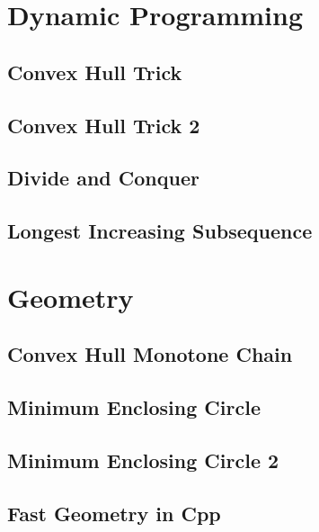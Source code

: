 \section{Dynamic Programming}
\subsection{Convex Hull Trick}
\raggedbottom
\hrulefill
\subsection{Convex Hull Trick 2}
\raggedbottom
\hrulefill
\subsection{Divide and Conquer}
\raggedbottom
\hrulefill
\subsection{Longest Increasing Subsequence}
\raggedbottom
\hrulefill

\section{Geometry}
\subsection{Convex Hull Monotone Chain}
\raggedbottom
\hrulefill
\subsection{Minimum Enclosing Circle}
\raggedbottom
\hrulefill
\subsection{Minimum Enclosing Circle 2}
\raggedbottom
\hrulefill
\subsection{Fast Geometry in Cpp}
\raggedbottom
\hrulefill

